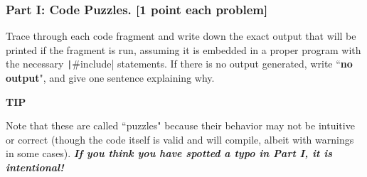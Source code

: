 \documentclass[12pt]{article}
\newenvironment{tip}{\par\begin{mdframed}[linewidth=1pt,linecolor=ForestGreen]%
		\begin{list}{}{\leftmargin=0cm}\item[\Large\bclampe]}
		{\end{list}\end{mdframed}\par}
\begin{document}
\newpage
\subsubsection*{Part I: Code Puzzles. [1 point each problem]}

Trace through each code fragment and write down the exact output that will be printed if the fragment is run, assuming it is embedded in a proper program with the necessary \texttt|#include| statements. If there is no output generated, write ``\textbf{no output}", and give one sentence explaining why.\\ 

\begin{tip}
	\textbf{TIP}
	
	Note that these are called ``puzzles" because their behavior may not be intuitive or correct (though the code itself is valid and will compile, albeit with warnings in some cases).  \textbf{\textit{If you think you have spotted a typo in Part I, it is intentional!}}
\end{tip}
\end{document}
